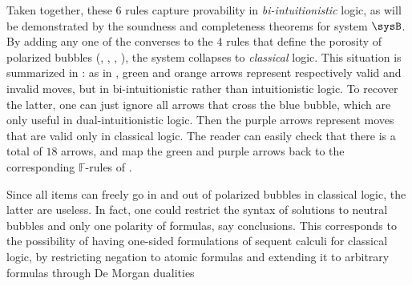 \begin{description}
  Taken together, these $6$ rules capture provability in
  \emph{bi-intuitionistic} logic, as will be demonstrated by the soundness and
  completeness theorems for system $\sysB$. By adding any one of the converses
  to the $4$ rules that define the porosity of polarized bubbles
  (, , ,
  ), the system collapses to \emph{classical} logic.
  This situation is summarized in : as in
  , green and orange arrows represent respectively valid
  and invalid moves, but in bi-intuitionistic rather than intuitionistic logic.
  To recover the latter, one can just ignore all arrows that cross the blue
  bubble, which are only useful in dual-intuitionistic logic. Then the purple
  arrows represent moves that are valid only in classical logic. The reader can
  easily check that there is a total of $18$ arrows, and map the green and
  purple arrows back to the corresponding $\mathbb{F}$-rules of
  .

  \begin{remark}
    Since all items can freely go in and out of polarized bubbles in classical
    logic, the latter are useless. In fact, one could restrict the syntax of
    solutions to neutral bubbles and only one polarity of formulas, say
    conclusions. This corresponds to the possibility of having one-sided
    formulations of sequent calculi for classical logic, by restricting negation
    to atomic formulas and extending it to arbitrary formulas through De Morgan
    dualities
  \end{remark}
  

\end{description}
